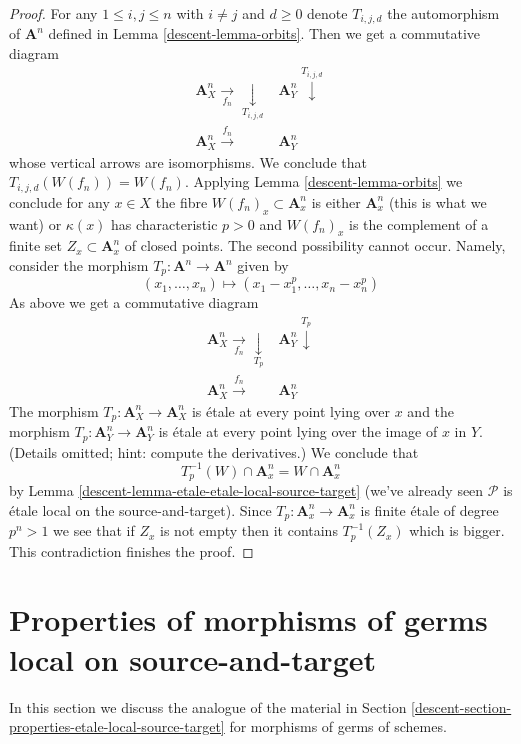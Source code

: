 \begin{proof}
\medskip\noindent
For any $1 \leq i, j \leq n$ with $i \not = j$ and $d \geq 0$
denote $T_{i, j, d}$ the automorphism of $\mathbf{A}^n$ defined
in Lemma \ref{descent-lemma-orbits}. Then we get a commutative diagram
$$
\begin{array}{cc}\mathbf{A}^n_X \underset{f_n}{\longrightarrow}\underset{T_{i, j, d}}{\downarrow} & \mathbf{A}^n_Y \overset{T_{i, j, d}}{\downarrow} \\ \mathbf{A}^n_X \overset{f_n}{\longrightarrow} & \mathbf{A}^n_Y\end{array}
$$
whose vertical arrows are isomorphisms. We conclude that
$T_{i, j, d}(W(f_n)) = W(f_n)$. Applying Lemma \ref{descent-lemma-orbits}
we conclude for any $x \in X$ the fibre $W(f_n)_x \subset \mathbf{A}^n_x$ is
either $\mathbf{A}^n_x$ (this is what we want) or $\kappa(x)$
has characteristic $p > 0$ and $W(f_n)_x$
is the complement of a finite set $Z_x \subset \mathbf{A}^n_x$
of closed points. The second possibility cannot occur. Namely,
consider the morphism $T_p : \mathbf{A}^n \to \mathbf{A}^n$ given by
$$
(x_1, \ldots, x_n) \mapsto (x_1 - x_1^p, \ldots, x_n - x_n^p)
$$
As above we get a commutative diagram
$$
\begin{array}{cc}\mathbf{A}^n_X \underset{f_n}{\longrightarrow}\underset{T_p}{\downarrow} & \mathbf{A}^n_Y \overset{T_p}{\downarrow} \\ \mathbf{A}^n_X \overset{f_n}{\longrightarrow} & \mathbf{A}^n_Y\end{array}
$$
The morphism $T_p : \mathbf{A}^n_X \to \mathbf{A}^n_X$
is \'etale at every point lying over $x$
and the morphism $T_p : \mathbf{A}^n_Y \to \mathbf{A}^n_Y$
is \'etale at every point lying over the image of $x$ in $Y$.
(Details omitted; hint: compute the derivatives.)
We conclude that
$$
T_p^{-1}(W) \cap \mathbf{A}^n_x = W \cap \mathbf{A}^n_x
$$
by Lemma \ref{descent-lemma-etale-etale-local-source-target}
(we've already seen $\mathcal{P}$ is
\'etale local on the source-and-target).
Since $T_p : \mathbf{A}^n_x \to \mathbf{A}^n_x$ is finite \'etale
of degree $p^n > 1$ we see that if $Z_x$ is not empty then it contains
$T_p^{-1}(Z_x)$ which is bigger. This contradiction finishes
the proof.
\end{proof}

\section{Properties of morphisms of germs local on source-and-target}
\label{descent-section-local-source-target-at-point}
In this section we discuss the analogue of the material in
Section \ref{descent-section-properties-etale-local-source-target}
for morphisms of germs of schemes.

